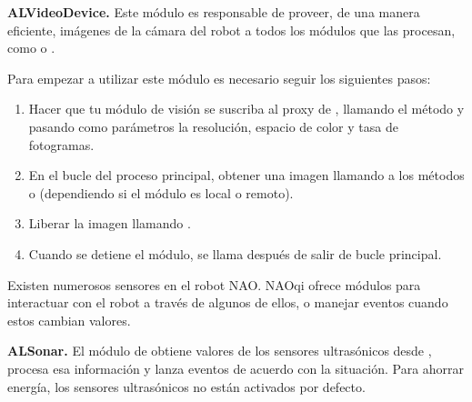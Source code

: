 \textbf{ALVideoDevice.}
\label{\detokenize{chapter_one/naoqi:alvideodevice}}
Este módulo es responsable de proveer, de una manera eficiente, imágenes de la
cámara del robot a todos los módulos que las procesan, como 
o .


Para empezar a utilizar este módulo es necesario seguir los siguientes pasos:
\begin{enumerate}
\item {} 
Hacer que tu módulo de visión se suscriba al proxy de , llamando el método  y pasando como parámetros la resolución, espacio de color y tasa de fotogramas.

\item {} 
En el bucle del proceso principal, obtener una imagen llamando a los métodos  o  (dependiendo si el módulo es local o remoto).

\item {} 
Liberar la imagen llamando .

\item {} 
Cuando se detiene el módulo, se llama  después de salir de bucle principal.

\end{enumerate}

Existen numerosos sensores en el robot NAO. NAOqi ofrece módulos para interactuar
con el robot a través de algunos de ellos, o manejar eventos cuando estos
cambian valores.


\textbf{ALSonar.}
\label{\detokenize{chapter_one/naoqi:alsonar}}
El módulo de  obtiene valores de los sensores ultrasónicos desde
, procesa esa información y lanza eventos de acuerdo con la situación.
Para ahorrar energía, los sensores ultrasónicos no están activados por defecto.

